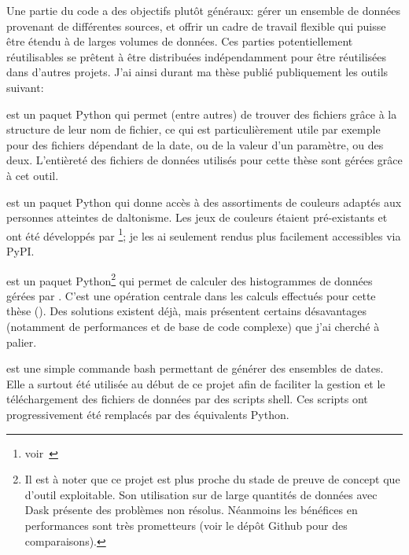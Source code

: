 Une partie du code a des objectifs plutôt généraux: gérer un ensemble de données provenant de différentes sources, et offrir un cadre de travail flexible qui puisse être étendu à de larges volumes de données.
Ces parties potentiellement réutilisables se prêtent à être distribuées indépendamment pour être réutilisées dans d'autres projets.
J'ai ainsi durant ma thèse publié publiquement les outils suivant:
\begin{description}
  \setlength{\itemsep}{2\baselineskip}
  \item[FileFinder]
        est un paquet Python qui permet (entre autres) de trouver des fichiers grâce à la structure de leur nom de fichier, ce qui est particulièrement utile par exemple pour des fichiers dépendant de la date, ou de la valeur d'un paramètre, ou des deux.
        L'entièreté des fichiers de données utilisés pour cette thèse sont gérées grâce à cet outil.

  \item[tol-colors]
        est un paquet Python qui donne accès à des assortiments de couleurs adaptés aux personnes atteintes de daltonisme.
        Les jeux de couleurs étaient pré-existants et ont été développés par \footnote{voir~}; je les ai seulement rendus plus facilement accessibles via PyPI.

  \item[Xarray-histogram]
        est un paquet Python\footnote{%
        Il est à noter que ce projet est plus proche du stade de preuve de concept que d'outil exploitable.
        Son utilisation sur de large quantités de données avec Dask présente des problèmes non résolus.
        Néanmoins les bénéfices en performances sont très prometteurs (voir le dépôt Github pour des comparaisons).
        } qui permet de calculer des histogrammes de données gérées par .
        C'est une opération centrale dans les calculs effectués pour cette thèse ().
        Des solutions existent déjà, mais présentent certains désavantages (notamment de performances et de base de code complexe) que j'ai cherché à palier.

  \item[dateloop]
        est une simple commande bash permettant de générer des ensembles de dates.
        Elle a surtout été utilisée au début de ce projet afin de faciliter la gestion et le téléchargement des fichiers de données par des scripts shell. Ces scripts ont progressivement été remplacés par des équivalents Python.

\end{description}

